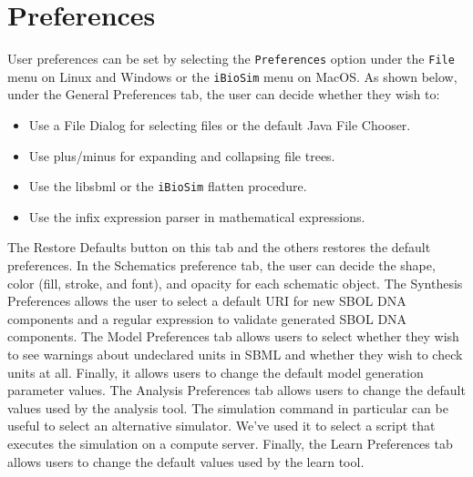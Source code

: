 \documentclass[titlepage,11pt]{article}
\begin{document}
\section{\label{Preferences}Preferences}

\noindent
User preferences can be set by selecting the {\tt Preferences} option under the {\tt File} menu on Linux and Windows or the {\tt iBioSim} menu on MacOS.  As shown below, under the General Preferences tab, the user can decide whether they wish to:
\begin{itemize}
\item Use a File Dialog for selecting files or the default Java File Chooser.  
\item Use plus/minus for expanding and collapsing file trees.  
\item Use the libsbml or the {\tt iBioSim} flatten procedure.
\item Use the infix expression parser in mathematical expressions.
\end{itemize}
The Restore Defaults button on this tab and the others restores the default preferences.  In the Schematics preference tab, the user can decide the shape, color (fill, stroke, and font), and opacity for each schematic object.  The Synthesis Preferences allows the user to select a default URI for new SBOL DNA components and a regular expression to validate generated SBOL DNA components.  The Model Preferences tab allows users to select whether they wish to see warnings about undeclared units in SBML and whether they wish to check units at all.  Finally, it allows users to change the default model generation parameter values.  The Analysis Preferences tab allows users to change the default values used by the analysis tool.  The simulation command in particular can be useful to select an alternative simulator.  We've used it to select a script that executes the simulation on a compute server.  Finally, the Learn Preferences tab allows users to change the default values used by the learn tool.
\end{document}
